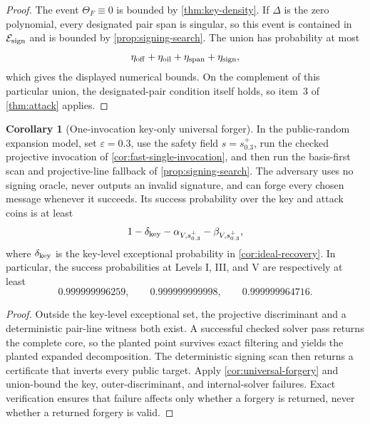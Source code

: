 \documentclass[11pt,a4paper]{article}
\theoremstyle{definition}
\newtheorem{corollary}[theorem]{Corollary}
\theoremstyle{remark}
\newcommand{\cE}{\mathcal E}
\newcommand{\oil}{\mathrm{oil}}
\newcommand{\off}{\mathrm{off}}
\begin{document}
\begin{proof}
The event $\Theta_F\equiv0$ is bounded by \cref{thm:key-density}.  If $\Delta$ is the zero polynomial, every designated pair span is singular, so this event is contained in $\cE_{\rm sign}$ and is bounded by \cref{prop:signing-search}.  The union has probability at most
\[
\eta_{\off}+\eta_{\oil}+\eta_{\rm span}+\eta_{\rm sign},
\]
which gives the displayed numerical bounds.  On the complement of this particular union, the designated-pair condition itself holds, so item~3 of \cref{thm:attack} applies.
\end{proof}

\begin{corollary}[One-invocation key-only universal forger]\label{cor:single-invocation-forger}
In the public-random expansion model, set $\varepsilon=0.3$, use the safety field $s=s_{0.3}^+$, run the checked projective invocation of \cref{cor:fast-single-invocation}, and then run the basis-first scan and projective-line fallback of \cref{prop:signing-search}.  The adversary uses no signing oracle, never outputs an invalid signature, and can forge every chosen message whenever it succeeds.  Its success probability over the key and attack coins is at least
\begin{equation}\label{eq:one-pass-forger-success}
 1-\delta_{\rm key}-\alpha_{V,s_{0.3}^+}-\beta_{V,s_{0.3}^+},
\end{equation}
where $\delta_{\rm key}$ is the key-level exceptional probability in \cref{cor:ideal-recovery}.  In particular, the success probabilities at Levels I, III, and V are respectively at least
\[
 0.999999996259,\qquad0.999999999998,\qquad0.999999964716.
\]
\end{corollary}

\begin{proof}
Outside the key-level exceptional set, the projective discriminant and a deterministic pair-line witness both exist.  A successful checked solver pass returns the complete core, so the planted point survives exact filtering and yields the planted expanded decomposition.  The deterministic signing scan then returns a certificate that inverts every public target.  Apply \cref{cor:universal-forgery} and union-bound the key, outer-discriminant, and internal-solver failures.  Exact verification ensures that failure affects only whether a forgery is returned, never whether a returned forgery is valid.
\end{proof}
\end{document}

